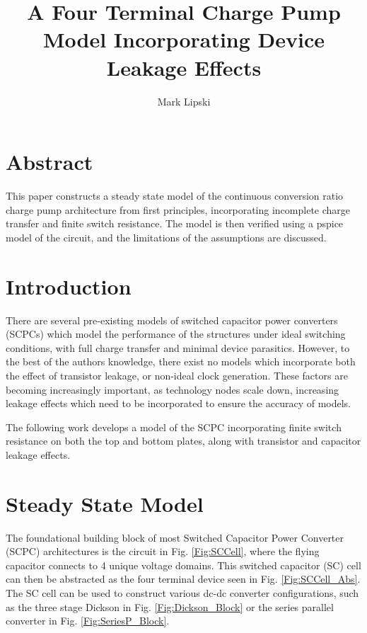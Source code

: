 \documentclass[conference]{IEEEtran}
\title{A Four Terminal Charge Pump Model Incorporating Device Leakage Effects}
\author{Mark Lipski}
\begin{document}
	\maketitle
	\section{Abstract}
	This paper constructs a steady state model of the continuous conversion ratio charge pump architecture from first principles, incorporating incomplete charge transfer and finite switch resistance. The model is then verified using a pspice model of the circuit, and the limitations of the assumptions are discussed.
	\section{Introduction}
	There are several pre-existing models of switched capacitor power converters (SCPCs) which model the performance of the structures under ideal switching conditions, with full charge transfer and minimal device parasitics. However, to the best of the authors knowledge, there exist no models which incorporate both the effect of transistor leakage, or non-ideal clock generation. These factors are becoming increasingly important, as technology nodes scale down, increasing leakage effects which need to be incorporated to ensure the accuracy of models.  
	
	The following work develops a model of the SCPC incorporating finite switch resistance on both the top and bottom plates, along with transistor and capacitor leakage effects. 
	\section{Steady State Model}
	The foundational building block of most Switched Capacitor Power Converter (SCPC) architectures is the circuit in Fig. \ref{Fig:SCCell}, where the flying capacitor connects to 4 unique voltage domains. This switched capacitor (SC) cell can then be abstracted as the four terminal device seen in Fig. \ref{Fig:SCCell_Abs}. The SC cell can be used to construct various dc-dc converter configurations, such as the three stage Dickson in Fig. \ref{Fig:Dickson_Block} or the series parallel converter in Fig. \ref{Fig:SeriesP_Block}.
	
\end{document}
